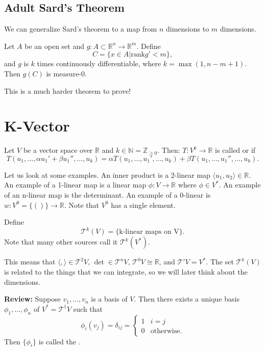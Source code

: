 \documentclass{article}
\numberwithin{equation}{section}
\begin{document}
\subsection{Adult Sard's Theorem}
We can generalize Sard's theorem to a map from $n$ dimensions to $m$ dimensions.
\begin{theorem}
    Let $A$ be an open set and $g:A\subset\mathbb{R}^n \rightarrow \mathbb{R}^m.$ Define 
    \begin{equation}
        C = \{x\in A| \text{rank}g' < m\},
    \end{equation}
    and $g$ is $k$ times continuously differentiable, where $k=\max(1,n-m+1).$ Then $g(C)$ is measure-0. 
\end{theorem}
This is a much harder theorem to prove!
\section{K-Vector}
\begin{definition}
    Let $V$ be a vector space over $\mathbb{R}$ and $k\in \mathbb{N} = \mathbb{Z}_{\ge 0}$. Then: $T:V^k \rightarrow \mathbb{R}$ is called  or  if
    \begin{equation}
        T(u_1,\dots,\alpha u_1' + \beta u_1{''}, \dots, u_k) = \alpha T(u_1,\dots,u_1',\dots,u_k)+\beta T(u_1,\dots,u_1'',\dots,u_k).
    \end{equation}
\end{definition}
Let us look at some examples. An inner product is a 2-linear map $\langle u_1,u_2\rangle \in \mathbb{R}$. An example of a 1-linear map is a linear map $\phi:V\rightarrow \mathbb{R}$ where $\phi \in V^*.$ An example of an n-linear map is the determinant. An example of a 0-linear is $w:V^0 = \{()\} \rightarrow \mathbb{R}$. Note that $V^0$ has a single element.
\begin{definition}
    Define
    \begin{equation}
        \mathcal{T}^k(V) = \{\text{k-linear maps on V}\}.
    \end{equation}
    Note that many other sources call it $\mathcal{T}^k(V^*).$
\end{definition}
This means that $\langle,\rangle \in \mathcal{T}^2V$, $\det \in \mathcal{T}^nV$, $\mathcal{T}^0V \cong \mathbb{R}$, and $\mathcal{T}'V = V^*.$ The set $\mathcal{T}^k(V)$ is related to the things that we can integrate, so we will later think about the dimensions.

\textbf{Review:} Suppose $v_1,\dots,v_n$ is a basis of $V$. Then there exists a unique basis $\phi_1,\dots,\phi_n$ of $V^* = \mathcal{T}^1V$ such that
\begin{equation}
    \phi_i(v_j) = \delta_{ij} = \begin{cases}
        1 & i=j \\ 
        0 & \text{otherwise}.
    \end{cases}
\end{equation}
Then $\{\phi_i\}$ is called the .
\end{document}
